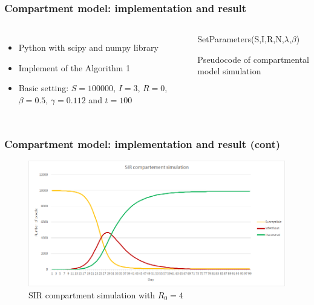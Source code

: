 \documentclass{beamer}
\begin{document}
\begin{frame}
\frametitle{Compartment model: implementation and result}
\begin{columns}[c] %


\begin{itemize}
\item Python with scipy and numpy library
\item Implement of the Algorithm 1
\item Basic setting: $S=100000$, $I=3$, $R=0$, $\beta=0.5$, $\gamma=0.112$ and $t=100$
\end{itemize}


\begin{algorithm}[H]\label{alg:alg2}
 SetParameters(S,I,R,N,$\lambda$,$\beta$)\;
\caption{Pseudocode of compartmental model simulation}
\end{algorithm}
\end{columns}


\end{frame}


\begin{frame}
\frametitle{Compartment model: implementation and result (cont)}
\begin{figure}[H]\label{fig:sir}
\centering	
\includegraphics[scale=0.4]{img/Sir_comp.png}
\caption{SIR compartment simulation with $R_0=4$}
\end{figure} 

\end{frame}
\end{document}
